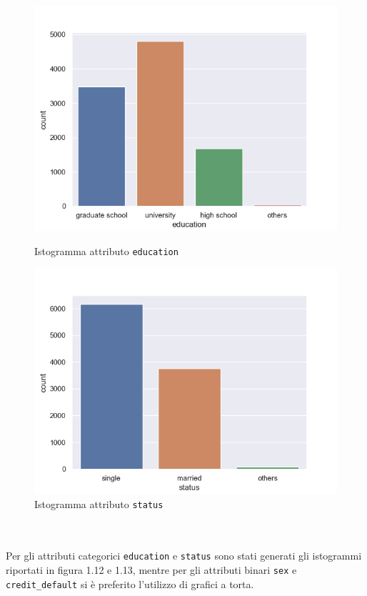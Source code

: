 \begin{figure}[!htb]
  \includegraphics[width=\linewidth]{img/education-hist.png}
  \caption{Istogramma attributo \texttt{education}}\label{edu-dist}
\endminipage\hfill
{}
  \includegraphics[width=\linewidth]{img/status-hist.png}
  \caption{Istogramma attributo \texttt{status}}\label{status-dist}
\endminipage\hfill
\end{figure}
\mbox{}\\\mbox{}\\

Per gli attributi categorici \texttt{education} e \texttt{status} sono stati generati gli istogrammi riportati in figura 1.12 e 1.13, mentre per gli attributi binari \texttt{sex} e \texttt{credit\_default} si è preferito l'utilizzo di grafici a torta.


